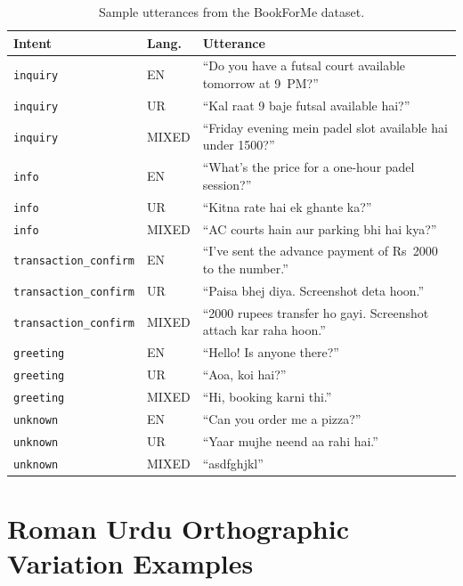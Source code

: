 \begin{table}[H]
\centering
\caption{Sample utterances from the BookForMe dataset.}
\label{tab:data-samples}
\small
\begin{tabularx}{\textwidth}{>{\raggedright\arraybackslash}p{}p{}Y}
\toprule
\textbf{Intent} & \textbf{Lang.} & \textbf{Utterance} \\
\midrule
\texttt{inquiry} & EN
  & ``Do you have a futsal court available tomorrow at 9~PM?'' \\
\texttt{inquiry} & UR
  & ``Kal raat 9 baje futsal available hai?'' \\
\texttt{inquiry} & MIXED
  & ``Friday evening mein padel slot available hai under 1500?'' \\
\hline
\texttt{info} & EN
  & ``What's the price for a one-hour padel session?'' \\
\texttt{info} & UR
  & ``Kitna rate hai ek ghante ka?'' \\
\texttt{info} & MIXED
  & ``AC courts hain aur parking bhi hai kya?'' \\
\hline
\texttt{transaction\_confirm} & EN
  & ``I've sent the advance payment of Rs~2000 to the number.'' \\
\texttt{transaction\_confirm} & UR
  & ``Paisa bhej diya. Screenshot deta hoon.'' \\
\texttt{transaction\_confirm} & MIXED
  & ``2000 rupees transfer ho gayi. Screenshot attach kar raha hoon.'' \\
\hline
\texttt{greeting} & EN
  & ``Hello! Is anyone there?'' \\
\texttt{greeting} & UR
  & ``Aoa, koi hai?'' \\
\texttt{greeting} & MIXED
  & ``Hi, booking karni thi.'' \\
\hline
\texttt{unknown} & EN
  & ``Can you order me a pizza?'' \\
\texttt{unknown} & UR
  & ``Yaar mujhe neend aa rahi hai.'' \\
\texttt{unknown} & MIXED
  & ``asdfghjkl'' \\
\bottomrule
\end{tabularx}
\end{table}

\section{Roman Urdu Orthographic Variation Examples}
\label{app:data-variation}

